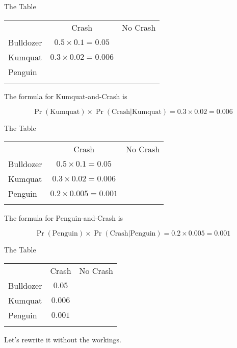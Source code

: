 \documentclass[
  ignorenonframetext,
]{beamer}
\renewcommand{\,}{\text{, }}
\begin{document}
\begin{frame}{The Table}
\protect\hypertarget{the-table-1}{}
\begin{longtable}[]{@{}lcc@{}}
\toprule
& Crash & No Crash \\ \addlinespace
\midrule
\endhead
Bulldozer & \(0.5 \times 0.1 = 0.05\) & \\ \addlinespace
Kumquat & \(0.3 \times 0.02 = 0.006\) & \\ \addlinespace
Penguin & & \\ \addlinespace
\bottomrule
\end{longtable}

The formula for Kumquat-and-Crash is

\[
\Pr(\text{Kumquat}) \times \Pr(\text{Crash}|\text{Kumquat}) = 0.3 \times 0.02 = 0.006
\]
\end{frame}

\begin{frame}{The Table}
\protect\hypertarget{the-table-2}{}
\begin{longtable}[]{@{}lcc@{}}
\toprule
& Crash & No Crash \\ \addlinespace
\midrule
\endhead
Bulldozer & \(0.5 \times 0.1 = 0.05\) & \\ \addlinespace
Kumquat & \(0.3 \times 0.02 = 0.006\) & \\ \addlinespace
Penguin & \(0.2 \times 0.005 = 0.001\) & \\ \addlinespace
\bottomrule
\end{longtable}

The formula for Penguin-and-Crash is

\[
\Pr(\text{Penguin}) \times \Pr(\text{Crash}|\text{Penguin}) = 0.2 \times 0.005 = 0.001
\]
\end{frame}

\begin{frame}{The Table}
\protect\hypertarget{the-table-3}{}
\begin{longtable}[]{@{}lcc@{}}
\toprule
& Crash & No Crash \\ \addlinespace
\midrule
\endhead
Bulldozer & \(0.05\) & \\ \addlinespace
Kumquat & \(0.006\) & \\ \addlinespace
Penguin & \(0.001\) & \\ \addlinespace
\bottomrule
\end{longtable}

Let's rewrite it without the workings.
\end{frame}
\end{document}

